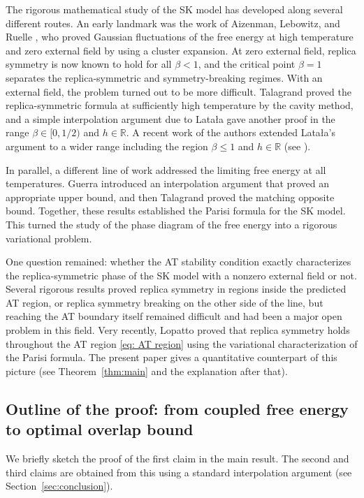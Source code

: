 \documentclass[11pt]{article}
\numberwithin{equation}{section}
\newcommand{\R}{\mathbb{R}}
\newcommand{\1}{\mathbf 1}
\begin{document}
The rigorous mathematical study of the SK model has developed along  several different routes. An early landmark was the work of  Aizenman, Lebowitz, and Ruelle \cite{AizenmanLebowitzRuelle1987}, who proved Gaussian fluctuations of the free energy at high temperature and zero external field by using a cluster expansion. At zero external field, replica symmetry is now known to hold for all $\beta<1$, and the critical point $\beta=1$ separates the replica-symmetric and symmetry-breaking regimes. With an external field, the problem turned out to be more difficult. Talagrand  proved the replica-symmetric formula at sufficiently high temperature by the cavity method, and a simple interpolation argument due to Lata\l{}a gave another proof in the range $\beta \in [0,1/2)$ and $h\in \R$. A recent work of the authors extended Lata\l{}a's argument to a wider range including the region $\beta\leq 1$ and $h\in \R $ (see \cite{KusuokaNakajima1}).

In parallel, a different line of work addressed the limiting free energy at all temperatures.  Guerra \cite{Guerra}  introduced an interpolation argument that proved an appropriate upper bound, and then  Talagrand \cite{TalagrandParisi} proved the matching opposite bound.  Together, these results established the Parisi formula for the SK model. This turned the study of the phase diagram of the free energy into a rigorous variational problem. 

One question remained: whether the AT stability condition exactly characterizes the replica-symmetric phase of the SK model with a nonzero external field or not.  Several rigorous results proved replica symmetry in regions inside the predicted AT region, or replica symmetry breaking on the other side of the line, but reaching the AT boundary itself remained difficult and had been a major open problem in this field. Very recently,  Lopatto \cite{Lopatto} proved that replica symmetry holds throughout the AT region \eqref{eq: AT region} 
 using the variational characterization of the Parisi formula.  The present paper gives a quantitative counterpart of this picture  (see Theorem~\ref{thm:main} and the explanation after that).

 
\subsection{Outline of the proof: from coupled free energy to optimal overlap bound}
\label{subsec:proof-outline}

We briefly sketch the proof of the first claim in the main result.
The second and third claims are obtained from this using a standard interpolation argument (see Section~\ref{sec:conclusion}).
\end{document}
